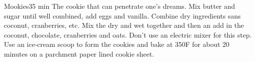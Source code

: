 \begin{recipe}{Mookies}{}{35 min}
\freeform The cookie that can penetrate one's dreams.
Mix butter and sugar until well combined, add eggs and vanilla. Combine dry ingredients sans coconut, cranberries, etc. Mix the dry and wet together and then an add in the coconut, chocolate, cranberries and oats. Don't use an electric mixer for this step.
Use an ice-cream scoop to form the cookies and bake at 350F for about 20 minutes on a parchment paper lined cookie sheet.
\end{recipe}

